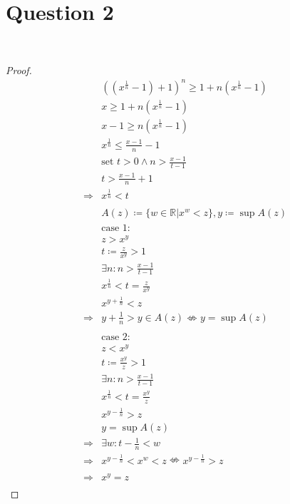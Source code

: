 \documentclass{article}
\begin{document}
\newpage

\section*{Question 2}

~

\begin{proof}
    \begin{align*}
        &((x^{\frac{1}{n}}-1)+1)^n\geqslant1+n(x^\frac{1}{n}-1)\\
        &x\geqslant 1+n(x^\frac{1}{n}-1)\\
        &x-1\geqslant n(x^{\frac{1}{n}}-1)\\
        &x^{\frac{1}{n}}\leqslant\frac{x-1}{n}-1\\
        &\text{set }t>0\land n>\frac{x-1}{t-1}\\
        &t>\frac{x-1}{n}+1\\
        \Rightarrow&x^{\frac{1}{n}}<t\\
        &\\
        &A(z)\coloneqq \{w\in\mathbb{R}|x^w<z\},y\coloneqq\sup A(z)\\
        &\text{case 1}:\\
        &z>x^y\\
        &t\coloneqq \frac{z}{x^y}>1\\
        &\exists n:n>\frac{x-1}{t-1}\\
        &x^{\frac{1}{n}}<t=\frac{z}{x^y}\\
        &x^{y+\frac{1}{n}}<z\\
        \Rightarrow&y+\frac{1}{n}>y\in A(z) \nLeftrightarrow y=\sup A(z)\\
        &\\
        &\text{case 2}:\\
        &z<x^y\\
        &t\coloneqq \frac{x^y}{z}>1\\
        &\exists n:n>\frac{x-1}{t-1}\\
        &x^{\frac{1}{n}}<t=\frac{x^y}{z}\\
        &x^{y-\frac{1}{n}}>z\\
        &y=\sup A(z)\\
        \Rightarrow&\exists w:t-\frac{1}{n}<w\\
        \Rightarrow&x^{y-\frac{1}{n}}<x^w<z\nLeftrightarrow x^{y-\frac{1}{n}}>z\\
        &\\
        \Rightarrow&x^y=z\\
    \end{align*}
\end{proof}
\end{document}
